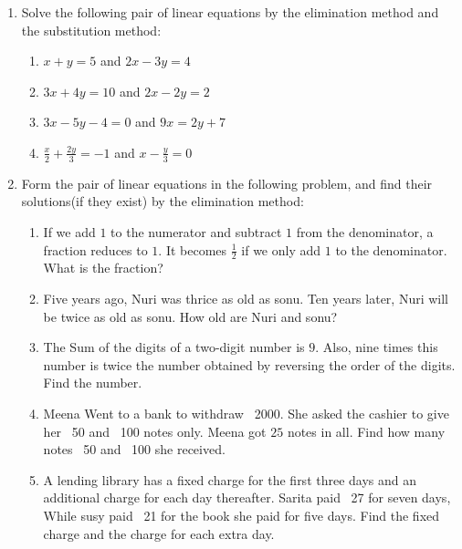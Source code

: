 \begin{enumerate}
\item Solve the following pair of linear equations by the elimination method and the substitution method:
\begin{enumerate}[label=(\roman*)]
\item $x+y=5$ and $2x-3y=4$
\item $3x+4y=10$ and $ 2x-2y=2$
\item $3x-5y-4=0$ and $9x=2y+7$
\item $\frac{x}{2}+\frac{2y}{3}=-1$ and $x-\frac{y}{3}=0$
\end{enumerate}
\item Form the pair of linear equations in the following problem, and find their solutions(if they exist) by the elimination method:
\begin{enumerate}[label=(\roman*)]
\item If we add $1$ to the numerator and subtract $1$ from the denominator, a fraction reduces to $1$. It becomes $\frac{1}{2}$ if we only add $1$ to the denominator. What is the fraction?
\item Five years ago, Nuri was thrice as old as sonu. Ten years later, Nuri will be twice as old as sonu. How old are Nuri and sonu?
\item The Sum of the digits of a two-digit number is $9$. Also, nine times this number is twice the number obtained by reversing the order of the digits. Find the number.
\item Meena Went to a bank to withdraw \rupee~2000. She asked the cashier to give her \rupee~50 and \rupee~100 notes only. Meena got $25$ notes in all. Find how many notes \rupee~50 and \rupee~100 she received.
\item A lending library has a fixed charge for the first three days and an additional charge for each day thereafter. Sarita paid \rupee~27 for seven days, While susy paid \rupee~21 for the book she paid for five days. Find the fixed charge and the charge for each extra day.  
\end{enumerate}
\end{enumerate}
